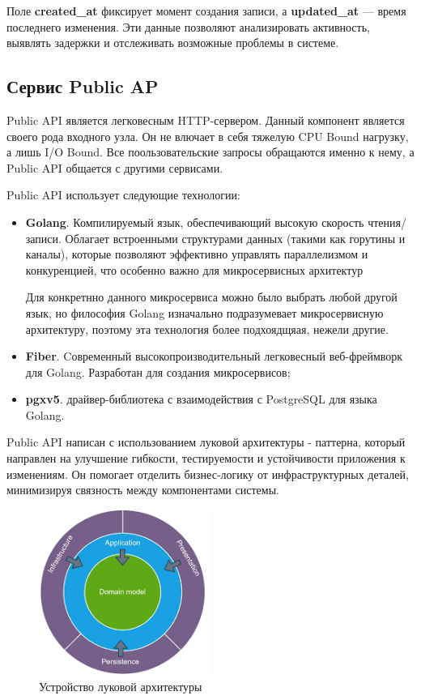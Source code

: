 \begin{itemize}
\begin{itemize}
Поле \textbf{created\_at} фиксирует момент создания записи, а \textbf{updated\_at} — время последнего изменения. Эти данные позволяют анализировать активность, выявлять задержки и отслеживать возможные проблемы в системе.
\end{itemize}

\subsection{Сервис Public AP}
Public API является легковесным HTTP-сервером. Данный компонент является своего рода входного узла.  Он не влючает в себя тяжелую CPU Bound нагрузку, а лишь I/O Bound. 
Все поользовательские запросы обращаются именно к нему, а Public API общается с другими сервисами.

Public API использует следующие технологии:
\begin{itemize}
\item  \textbf{Golang}. Компилируемый язык, обеспечивающий высокую скорость чтения/записи. Облагает встроенными структурами данных (такими как горутины и каналы), которые позволяют эффективно управлять параллелизмом и конкуренцией, что особенно важно для микросервисных архитектур

Для конкретнно данного микросервиса можно было выбрать любой другой язык, но философия Golang изначально подразумевает микросервисную архитектуру, поэтому эта технология более подхоядщяая, нежели другие.
\item  \textbf{Fiber}. Cовременный высокопроизводительный легковесный веб-фреймворк для Golang. Разработан для создания микросервисов;
\item \textbf{pgxv5}. драйвер-библиотека с  взаимодействия с PostgreSQL для языка Golang.

\end{itemize}

Public API написан с использованием луковой архитектуры - паттерна, который направлен на улучшение гибкости, тестируемости и устойчивости приложения к изменениям. Он помогает отделить бизнес-логику от инфраструктурных деталей, минимизируя связность между компонентами системы.

\begin{figure}[H]
    \centering
    \includegraphics[width=0.5\textwidth]{styles/diploma/inc/onion1.png} 
    \caption{Устройство луковой  архитектуры}
    \label{fig:example}
\end{figure}


\end{itemize}
